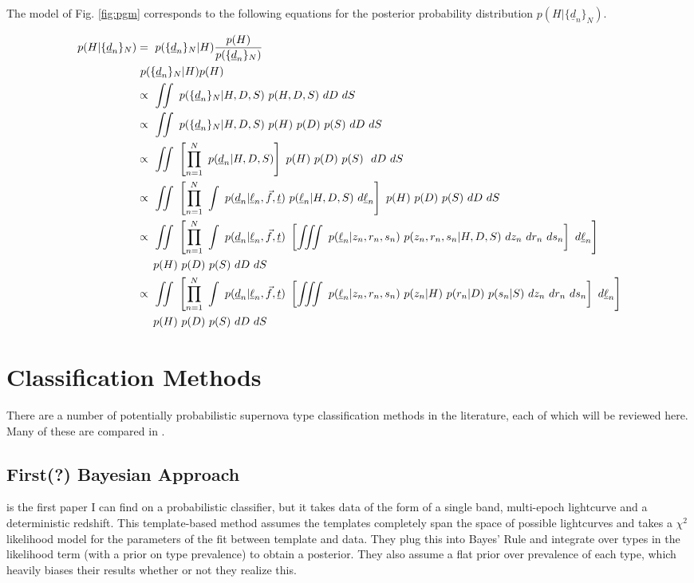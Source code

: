 \documentclass[12pt, onecolumn]{emulateapj}
\newcommand{\textul}{\underline}
\begin{document}
The model of Fig. \ref{fig:pgm} corresponds to the following equations for the posterior probability distribution $p(H|\{\textul{d}_{n}\}_{N})$.  

\begin{align*}
p(H|\{\textul{d}_{n}\}_{N}) &=\ p(\{\textul{d}_{n}\}_{N}|H)\frac{p(H)}{p(\{\textul{d}_{n}\}_{N})}\\
&\ p(\{\textul{d}_{n}\}_{N}|H)p(H)\\
&\propto\ \iint\ p(\{\textul{d}_{n}\}_{N}|H,D,S)\ p(H,D,S)\ dD\ dS\\
&\propto\ \iint\ p(\{\textul{d}_{n}\}_{N}|H,D,S)\ p(H)\ p(D)\ p(S)\ dD\ dS\\
&\propto\ \iint\ \left[\prod_{n=1}^{N}\ p(\textul{d}_{n}|H,D,S)\right]\ p(H)\ p(D)\ p(S)\ \ dD\ dS\\
&\propto\ \iint\ \left[\prod_{n=1}^{N}\ \int\ p(\textul{d}_{n}|\textul{\ell}_{n},\vec{f},\textul{t})\ p(\textul{\ell}_{n}|H,D,S)\ d\textul{\ell}_{n}\right]\ p(H)\ p(D)\ p(S)\ dD\ dS\\
&\propto\ \iint\ \left[\prod_{n=1}^{N}\ \int\ p(\textul{d}_{n}|\textul{\ell}_{n},\vec{f},\textul{t})\ \left[\iiint\ p(\textul{\ell}_{n}|z_{n},r_{n},s_{n})\ p(z_{n},r_{n},s_{n}|H,D,S)\ dz_{n}\ dr_{n}\ ds_{n}\right]\ d\textul{\ell}_{n}\right]\\
&\indent p(H)\ p(D)\ p(S)\ dD\ dS\\
&\propto\ \iint\ \left[\prod_{n=1}^{N}\ \int\ p(\textul{d}_{n}|\textul{\ell}_{n},\vec{f},\textul{t})\ \left[\iiint\ p(\textul{\ell}_{n}|z_{n},r_{n},s_{n})\ p(z_{n}|H)\ p(r_{n}|D)\ p(s_{n}|S)\ dz_{n}\ dr_{n}\ ds_{n}\right]\ d\textul{\ell}_{n}\right]\\
&\indent p(H)\ p(D)\ p(S)\ dD\ dS
\end{align*}

\section{Classification Methods}

There are a number of potentially probabilistic supernova type classification methods in the literature, each of which will be reviewed here.  Many of these are compared in \citet{Kessler10}.

\subsection{First(?) Bayesian Approach}

\citet{Kuznetsova06} is the first paper I can find on a probabilistic classifier, but it takes data of the form of a single band, multi-epoch lightcurve and a deterministic redshift.  This template-based method assumes the templates completely span the space of possible lightcurves and takes a $\chi^{2}$ likelihood model for the parameters of the fit between template and data.  They plug this into Bayes' Rule and integrate over types in the likelihood term (with a prior on type prevalence) to obtain a posterior.  They also assume a flat prior over prevalence of each type, which heavily biases their results whether or not they realize this.
\end{document}
